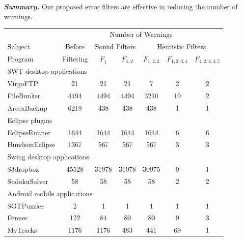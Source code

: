 \vspace{1mm}

\noindent \textbf{\textit{Summary.}} Our proposed error filters are 
effective in reducing the number of warnings.

\begin{table}[t]
\begin{center}
 \fontsize{9pt}{\baselineskip}\selectfont
\setlength{\tabcolsep}{.40\tabcolsep}
\hspace*{-0.2cm}
\begin{tabular}{|l||c|c|c|c|c|c|}
\hline
 & \multicolumn{6}{|c|}{Number of Warnings}  \\
\cline{2-7}
 Subject & Before & \multicolumn{2}{|c|}{Sound Filters}  &  \multicolumn{3}{|c|}{Heuristic Filters}  \\
\cline{3-7}
 Program &Filtering  & $F_1$ & $F_{1,2}$ & $F_{1,2,3}$&$F_{1,2,3,4}$ & $F_{1,2,3,4,5}$\\
\hline \hline
\multicolumn{7}{|l|}{SWT desktop applications}   \\
 \hline
 VirgoFTP &  21 &  21 &  21 & 7 &  2 & 2\\
 \hline
 FileBunker &  4494 &  4494 &  4494 &  3210 &  10  & 2\\
 \hline
 ArecaBackup &  6219 &  438 & 438 &  438  &  1 & 1\\
 \hline
 \hline
\multicolumn{7}{|l|}{Eclipse plugins}   \\
 \hline
 EclipseRunner&  1644 &  1644 &  1644 & 1644 &  6 & 6\\
 \hline
 HundsonEclipse&  1367 &  567 &  567 & 567 &  3 & 3\\
 \hline
 \hline
\multicolumn{7}{|l|}{Swing desktop applications}   \\
 \hline
 S3dropbox&  45528 &  31978 &  31978 & 30975 &  9 & 1\\
 \hline
 SudokuSolver &  58 &  58 &  58 & 58  &  2 & 2\\
 \hline
 \hline
\multicolumn{7}{|l|}{Android mobile applications}   \\
 \hline
 SGTPuzzler&  2 &  1 &  1 & 1 &  1 & 1\\
 \hline
 Fennec &  122 &  84 & 80 & 80 &  9 & 3\\
 \hline
 MyTracks &  1176 &  1176 &  483 & 441 &  69 & 1 \\

\end{tabular}
\end{center}
\end{table}
